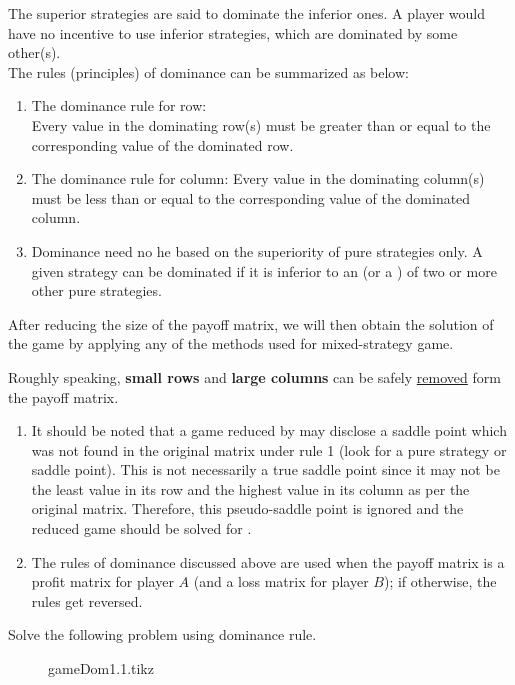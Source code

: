 \documentclass[../main-sheet.tex]{subfiles}
\begin{document}
    The superior strategies are said to dominate the inferior ones. A player would have no incentive to use inferior strategies, which are dominated by some other(s).\\
    The rules (principles) of dominance can be summarized as below:
    \begin{enumerate}[label=(\roman*)]
        \item The dominance rule for row:\\
        Every value in the dominating row(s) must be greater than or equal to the corresponding value of the dominated row.
        \item The dominance rule for column:
        Every value in the dominating column(s) must be less than or equal to the corresponding value of the dominated column.
        \item Dominance need no he based on the superiority of pure strategies only. A given strategy can be dominated if it is inferior to an  (or a ) of two or more other pure strategies.
    \end{enumerate}
    After reducing the size of the payoff matrix, we will then obtain the solution of the game by applying any of the methods used for mixed-strategy game.
    \begin{note}
        Roughly speaking, \textbf{small rows} and \textbf{large columns} can be safely \underline{removed} form the payoff matrix.
    \end{note}
    \begin{rem}
        \hfill
        \begin{enumerate}
            \item It should be noted that a  game reduced by  may disclose a saddle point which was not found in the original matrix under rule 1 (look for a pure strategy or saddle point). This is not necessarily a true saddle point since it may not be the least value in its row and the highest value in its column as per the original matrix. Therefore, this pseudo-saddle point is ignored and the reduced game should be solved for .
            \item The rules of dominance discussed above are used when the payoff matrix is a profit matrix for player \(A\) (and a loss matrix for player \(B\)); if otherwise, the rules get reversed.
        \end{enumerate}
    \end{rem}
    \begin{prob}
        Solve the following problem using dominance rule.
        \begin{figure}[H]
            \centering
            {gameDom1.1.tikz}
        \end{figure}
    \end{prob}
\end{document}
